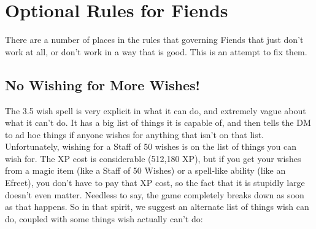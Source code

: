 
\section{Optional Rules for Fiends}

There are a number of places in the rules that governing Fiends that just don't work at all, or don't work in a way that is good. This is an attempt to fix them.

\subsection{No Wishing for More Wishes!}
The 3.5 wish spell is very explicit in what it can do, and extremely vague about what it can't do. It has a big list of things it is capable of, and then tells the DM to ad hoc things if anyone wishes for anything that isn't on that list. Unfortunately, wishing for a Staff of 50 wishes is on the list of things you can wish for. The XP cost is considerable (512,180 XP), but if you get your wishes from a magic item (like a Staff of 50 Wishes) or a spell-like ability (like an Efreet), you don't have to pay that XP cost, so the fact that it is stupidly large doesn't even matter. Needless to say, the game completely breaks down as soon as that happens. So in that spirit, we suggest an alternate list of things wish can do, coupled with some things wish actually can't do:


